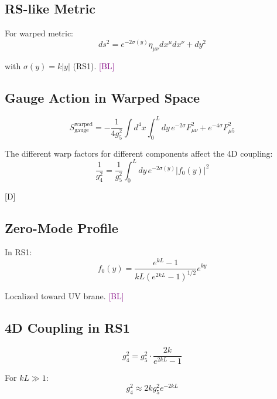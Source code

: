 \documentclass[11pt,a4paper]{article}
\newcommand{\tagD}{\textcolor{blue!70!black}{[D]}}
\newcommand{\tagBL}{\textcolor{purple}{[BL]}}
\begin{document}
\subsection{RS-like Metric}

For warped metric:
\begin{equation}
\label{eq:app-rs-metric}
ds^2 = e^{-2\sigma(y)} \eta_{\mu\nu} dx^\mu dx^\nu + dy^2
\end{equation}

with $\sigma(y) = k|y|$ (RS1). \tagBL

\subsection{Gauge Action in Warped Space}

\begin{equation}
\label{eq:app-warped-action}
S_{\text{gauge}}^{\text{warped}} = -\frac{1}{4g_5^2} \int d^4x \int_0^L dy\, e^{-2\sigma} F_{\mu\nu}^2
+ e^{-4\sigma} F_{\mu 5}^2
\end{equation}

The different warp factors for different components affect the 4D coupling:
\begin{equation}
\label{eq:app-g4-warped}
\frac{1}{g_4^2} = \frac{1}{g_5^2} \int_0^L dy\, e^{-2\sigma(y)} |f_0(y)|^2
\end{equation}

\tagD

\subsection{Zero-Mode Profile}

In RS1:
\begin{equation}
\label{eq:app-f0-rs}
f_0(y) = \frac{e^{kL} - 1}{kL(e^{2kL} - 1)^{1/2}} e^{ky}
\end{equation}

Localized toward UV brane. \tagBL

\subsection{4D Coupling in RS1}

\begin{equation}
\label{eq:app-g4-rs}
g_4^2 = g_5^2 \cdot \frac{2k}{e^{2kL} - 1}
\end{equation}

For $kL \gg 1$:
\begin{equation}
\label{eq:app-g4-rs-large}
g_4^2 \approx 2k g_5^2 e^{-2kL}
\end{equation}
\end{document}
